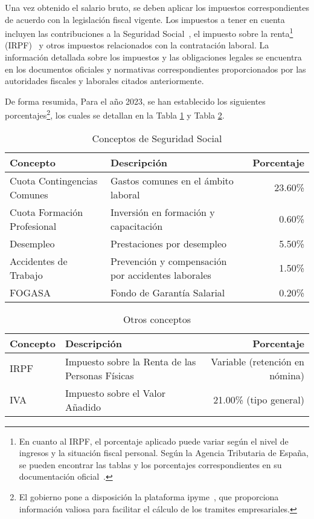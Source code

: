 \begin{enumerate}
\begin{enumerate}
    \end{enumerate}
    
    Una vez obtenido el salario bruto, se deben aplicar los impuestos correspondientes de acuerdo con la legislación fiscal vigente. Los impuestos a tener en cuenta incluyen las contribuciones a la Seguridad Social~\cite{Cotización}, el impuesto sobre la renta\footnote{En cuanto al IRPF, el porcentaje aplicado puede variar según el nivel de ingresos y la situación fiscal personal. Según la Agencia Tributaria de España, se pueden encontrar las tablas y los porcentajes correspondientes en su documentación oficial~\cite{AEAT}.} (IRPF)~\cite{IRPF} y otros impuestos relacionados con la contratación laboral. La información detallada sobre los impuestos y las obligaciones legales se encuentra en los documentos oficiales y normativas correspondientes proporcionados por las autoridades fiscales y laborales citados anteriormente. 
    
    
    De forma resumida, Para el año 2023, se han establecido los siguientes porcentajes\footnote{El gobierno pone a disposición la plataforma ipyme~\cite{ipyme}, que proporciona información valiosa para facilitar el cálculo de los tramites empresariales.}, los cuales se detallan en la Tabla \ref{tab:seguridad-social} y Tabla \ref{tab:no-seguridad-social}.

\begin{table}[h]
\centering
\begin{tabularx}{\textwidth}{@{}lXr@{}}
\toprule
\textbf{Concepto} & \textbf{Descripción} & \textbf{Porcentaje} \\
\midrule
Cuota Contingencias Comunes & Gastos comunes en el ámbito laboral & 23.60\% \\
Cuota Formación Profesional & Inversión en formación y capacitación & 0.60\% \\
Desempleo & Prestaciones por desempleo & 5.50\% \\
Accidentes de Trabajo & Prevención y compensación por accidentes laborales & 1.50\% \\
FOGASA & Fondo de Garantía Salarial & 0.20\% \\
\bottomrule
\end{tabularx}
\caption{Conceptos de Seguridad Social}
\label{tab:seguridad-social}
\end{table}

\begin{table}[h]
\centering
\begin{tabularx}{\textwidth}{@{}lXr@{}}
\toprule
\textbf{Concepto} & \textbf{Descripción} & \textbf{Porcentaje} \\
\midrule
IRPF & Impuesto sobre la Renta de las Personas Físicas & Variable (retención en nómina) \\
IVA & Impuesto sobre el Valor Añadido & 21.00\% (tipo general) \\
\bottomrule
\end{tabularx}
\caption{Otros conceptos}
\label{tab:no-seguridad-social}
\end{table}


\end{enumerate}
